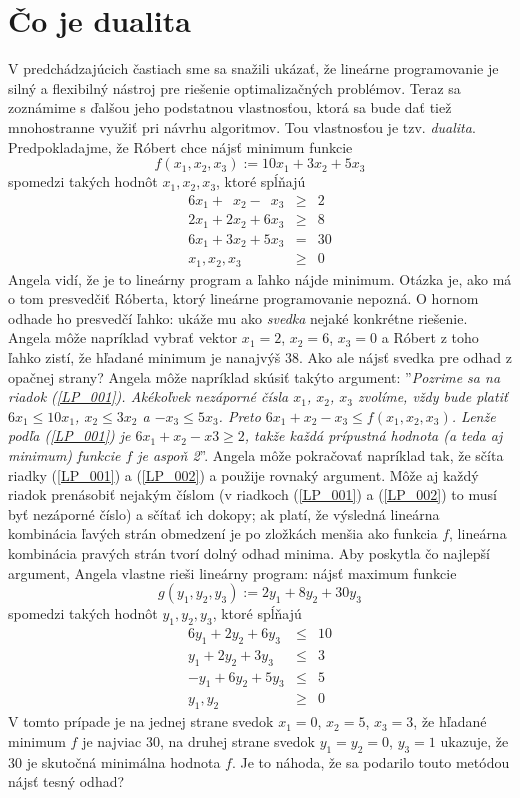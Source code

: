 \section{Čo je dualita}

\noindent
V predchádzajúcich častiach sme sa snažili ukázať, že lineárne programovanie je
silný a flexibilný nástroj pre riešenie optimalizačných problémov. Teraz sa zoznámime s ďalšou 
jeho podstatnou vlastnosťou, ktorá sa bude dať tiež mnohostranne využiť pri návrhu
algoritmov. Tou vlastnosťou je tzv. {\em dualita}. 
Predpokladajme, že Róbert chce  nájsť minimum funkcie 
$$f(x_1,x_2,x_3):=10x_1+3x_2+5x_3$$ 
spomedzi takých hodnôt $x_1, x_2, x_3$, ktoré sp\'lňajú
\begin{eqnarray}
\label{LP_001}6x_1 + \phantom{2}x_2 - \phantom{3}x_3&\ge&2\\
\label{LP_002}2x_1 + 2x_2 + 6x_3&\ge&8\\
6x_1 + 3x_2 + 5x_3&=&30\nonumber\\
x_1,x_2,x_3&\ge&0\nonumber
\end{eqnarray}
Angela vidí, že je to lineárny program a ľahko nájde minimum. Otázka je, ako má 
o tom presvedčiť Róberta, ktorý lineárne programovanie nepozná. 
O hornom odhade ho presvedčí ľahko: ukáže mu ako {\em svedka} nejaké konkrétne riešenie. Angela môže
napríklad vybrať vektor $x_1=2$, $x_2=6$, $x_3=0$ a Róbert z toho ľahko zistí, že hľadané minimum
je nanajvýš $38$. Ako ale nájsť svedka pre odhad z opačnej strany? Angela môže napríklad skúsiť 
takýto argument: ''{\em Pozrime sa na riadok (\ref{LP_001}). Akékoľvek nezáporné čísla $x_1$,
  $x_2$, $x_3$ zvolíme, vždy bude platiť $6x_1\le10x_1$, $x_2\le3x_2$ a $-x_3\le5x_3$. Preto
  $6x_1+x_2-x_3\le f(x_1,x_2,x_3)$. Lenže podľa  (\ref{LP_001}) je $6x_1+x_2-x3\ge2$,
takže každá prípustná hodnota (a teda aj minimum) funkcie $f$ je aspoň 2}''.
Angela môže pokračovať napríklad tak, že sčíta riadky (\ref{LP_001}) a (\ref{LP_002})
a použije rovnaký argument. Môže aj každý riadok prenásobiť nejakým číslom (v 
riadkoch (\ref{LP_001}) a (\ref{LP_002})
to musí byť nezáporné číslo) a sčítať ich dokopy; ak platí, že výsledná lineárna kombinácia
ľavých strán obmedzení 
je po zložkách menšia ako funkcia $f$, lineárna kombinácia pravých strán tvorí dolný odhad minima.
Aby poskytla čo najlepší argument, Angela vlastne rieši lineárny program:
nájsť maximum funkcie
$$g(y_1,y_2,y_3):=2 y_1+8 y_2+30 y_3$$
spomedzi takých hodnôt $y_1, y_2, y_3$, ktoré sp\'lňajú
\begin{eqnarray*}
6y_1 + 2y_2 + 6y_3 &\le& 10\\
y_1 + 2y_2 + 3y_3 &\le& 3\\
-y_1 + 6y_2 + 5y_3 &\le& 5\\
y_1,y_2 &\ge& 0
\end{eqnarray*}
V tomto prípade je na jednej strane svedok $x_1=0$, $x_2=5$, $x_3=3$, že hľadané minimum $f$ je najviac 30,
na druhej strane svedok $y_1=y_2=0$, $y_3=1$ ukazuje, že 30 je skutočná minimálna hodnota $f$.
Je to náhoda, že sa podarilo touto metódou nájsť tesný odhad?

